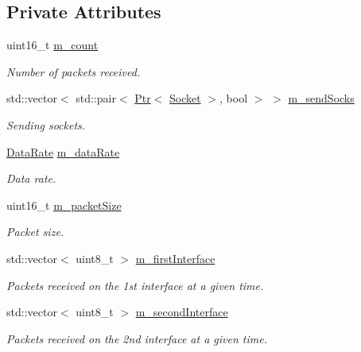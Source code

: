 \subsection*{Private Attributes}
\begin{DoxyCompactItemize}
\item 
uint16\+\_\+t \hyperlink{classIpv4DynamicGlobalRoutingTestCase_a92ca312da11a0ad225fb2175c6efe639}{m\+\_\+count}
\begin{DoxyCompactList}\small\item\em Number of packets received. \end{DoxyCompactList}\item 
std\+::vector$<$ std\+::pair$<$ \hyperlink{classns3_1_1Ptr}{Ptr}$<$ \hyperlink{classns3_1_1Socket}{Socket} $>$, bool $>$ $>$ \hyperlink{classIpv4DynamicGlobalRoutingTestCase_ab5c3600b2f8c2e1fa3b91977e7d4a3d0}{m\+\_\+send\+Socks}
\begin{DoxyCompactList}\small\item\em Sending sockets. \end{DoxyCompactList}\item 
\hyperlink{classns3_1_1DataRate}{Data\+Rate} \hyperlink{classIpv4DynamicGlobalRoutingTestCase_a9ea91681c005ee131e98cd118678b5f1}{m\+\_\+data\+Rate}
\begin{DoxyCompactList}\small\item\em Data rate. \end{DoxyCompactList}\item 
uint16\+\_\+t \hyperlink{classIpv4DynamicGlobalRoutingTestCase_a36e3a40f9475449e874fe30cb3e89fb6}{m\+\_\+packet\+Size}
\begin{DoxyCompactList}\small\item\em Packet size. \end{DoxyCompactList}\item 
std\+::vector$<$ uint8\+\_\+t $>$ \hyperlink{classIpv4DynamicGlobalRoutingTestCase_ac0a40f532a0ce5c35d25681227e9cee1}{m\+\_\+first\+Interface}
\begin{DoxyCompactList}\small\item\em Packets received on the 1st interface at a given time. \end{DoxyCompactList}\item 
std\+::vector$<$ uint8\+\_\+t $>$ \hyperlink{classIpv4DynamicGlobalRoutingTestCase_a4ff27c5c56ed3b6edf1f5cefc2e5f081}{m\+\_\+second\+Interface}
\begin{DoxyCompactList}\small\item\em Packets received on the 2nd interface at a given time. \end{DoxyCompactList}\end{DoxyCompactItemize}
